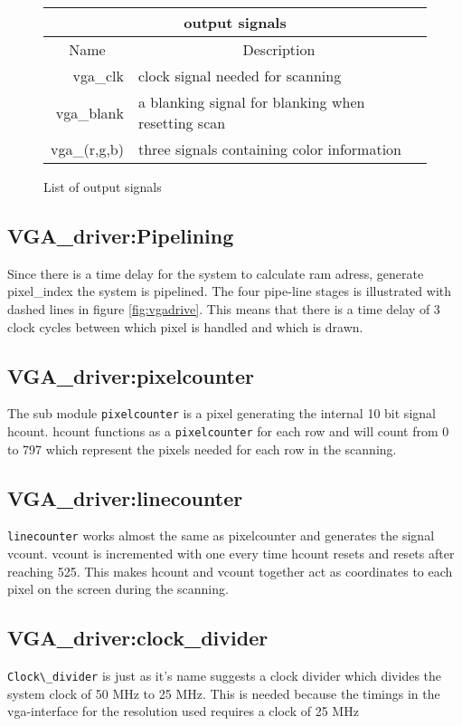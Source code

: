 \begin{figure}[h]
        \caption{List of output signals}
        \label{tab:output}
\begin{tabular}{|r|l|}     
        \hline
        \multicolumn{2}{|c|}{output signals}\\
        \hline
        \multicolumn{1}{|c}{Name} & \multicolumn{1}{c|}{Description} \\
        \hline
        vga\_clk & clock signal needed for scanning\\
        \cline{1-2}
        \hline
        vga\_blank & a blanking signal for blanking when resetting scan\\
        \cline{1-2}    
        \hline
        vga\_(r,g,b) & three signals containing color information\\
        \cline{1-2}    
        \hline
\end{tabular}
\end{figure}

\subsection{VGA\_driver:Pipelining}
Since there is a time delay for the system to calculate ram adress, generate pixel\_index the system is
pipelined. The four pipe-line stages is illustrated with dashed lines in figure \ref{fig:vgadrive}.
This means that there is a time delay of 3 clock cycles between which pixel is handled and which is drawn. 

\subsection{VGA\_driver:pixelcounter} 
The sub module \verb+pixelcounter+ is a pixel generating the internal 10 bit signal hcount. hcount
functions as a \verb+pixelcounter+ for each row and will count from 0 to 797 which represent the
pixels needed for each row in the scanning. 
 
\subsection{VGA\_driver:linecounter}
\verb+linecounter+ works almost the same as pixelcounter and generates the signal vcount. vcount is
incremented with one every time hcount resets and resets after reaching 525. This makes hcount and vcount together act as
coordinates to each pixel on the screen during the scanning.

\subsection{VGA\_driver:clock\_divider}
\verb+Clock\_divider+ is just as it's name suggests a clock divider which divides the system clock of 50 MHz
to 25 MHz. This is needed because the timings in the vga-interface for the resolution used 
requires a clock of 25 MHz 

